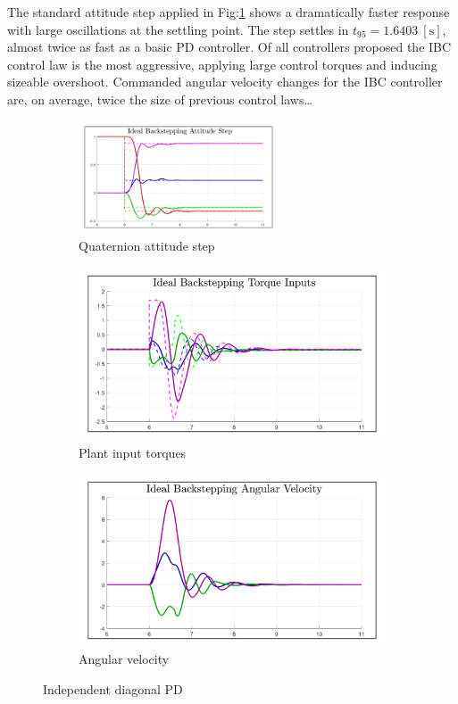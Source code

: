 \par
The standard attitude step applied in Fig:\ref{fig:IBC_Step} shows a dramatically faster response with large oscillations at the settling point. The step settles in $t_{95}=1.6403~[\text{s}]$, almost twice as fast as a basic PD controller. Of all controllers proposed the IBC control law is the most aggressive, applying large control torques and inducing sizeable overshoot. Commanded angular velocity changes for the IBC controller are, on average, twice the size of previous control laws\ldots
\begin{figure}[htbp]
\centering
\begin{subfigure}{\textwidth}
\centering
\includegraphics[width=0.65\textwidth]{graphs/IBC_Step}
\caption{Quaternion attitude step}
\label{fig:IBC_Step}
\end{subfigure}
\begin{subfigure}{0.49\textwidth}
\centering
\includegraphics[width=\textwidth]{graphs/IBC_Torque}
\caption{Plant input torques}
\label{fig:IBC_Torque}
\end{subfigure}
\begin{subfigure}{0.49\textwidth}
\centering
\includegraphics[width=\textwidth]{graphs/IBC_Angular}
\caption{Angular velocity}
\label{fig:IBC_Angular}
\end{subfigure}
\caption{Independent diagonal PD}
\end{figure}
